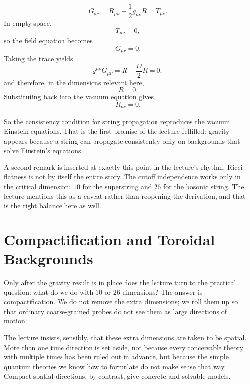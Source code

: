 \begin{equation}
G_{\mu\nu}=R_{\mu\nu}-\frac{1}{2}g_{\mu\nu}R=T_{\mu\nu}.
\end{equation}
In empty space,
\begin{equation}
T_{\mu\nu}=0,
\end{equation}
so the field equation becomes
\begin{equation}
G_{\mu\nu}=0.
\end{equation}
Taking the trace yields
\begin{equation}
g^{\mu\nu}G_{\mu\nu}
=
R-\frac{D}{2}R
=
0,
\end{equation}
and therefore, in the dimensions relevant here,
\begin{equation}
R=0.
\end{equation}
Substituting back into the vacuum equation gives
\begin{equation}
R_{\mu\nu}=0.
\end{equation}

So the consistency condition for string propagation reproduces the vacuum Einstein equations. That is the first promise of the lecture fulfilled: gravity appears because a string can propagate consistently only on backgrounds that solve Einstein's equations.

A second remark is inserted at exactly this point in the lecture's rhythm. Ricci flatness is not by itself the entire story. The cutoff independence works only in the critical dimension: \(10\) for the superstring and \(26\) for the bosonic string. The lecture mentions this as a caveat rather than reopening the derivation, and that is the right balance here as well.

\section{Compactification and Toroidal Backgrounds}

Only after the gravity result is in place does the lecture turn to the practical question: what do we do with \(10\) or \(26\) dimensions? The answer is compactification. We do not remove the extra dimensions; we roll them up so that ordinary coarse-grained probes do not see them as large directions of motion.

The lecture insists, sensibly, that these extra dimensions are taken to be spatial. More than one time direction is set aside, not because every conceivable theory with multiple times has been ruled out in advance, but because the simple quantum theories we know how to formulate do not make sense that way. Compact spatial directions, by contrast, give concrete and solvable models.

